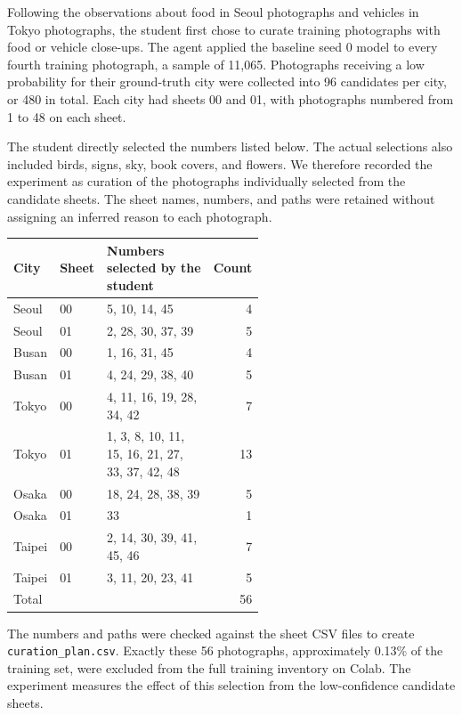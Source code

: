 \documentclass[11pt]{article}
\begin{document}
Following the observations about food in Seoul photographs and vehicles in
Tokyo photographs, the student first chose to curate training photographs
with food or vehicle close-ups. The agent applied the baseline seed 0 model
to every fourth training photograph, a sample of 11,065. Photographs receiving
a low probability for their ground-truth city were collected into 96
candidates per city, or 480 in total. Each city had sheets 00 and 01, with
photographs numbered from 1 to 48 on each sheet.

The student directly selected the numbers listed below. The actual selections
also included birds, signs, sky, book covers, and flowers. We therefore
recorded the experiment as curation of the photographs individually selected
from the candidate sheets. The sheet names, numbers, and paths were retained
without assigning an inferred reason to each photograph.

\begin{center}\small
\begin{tabular}{llp{0.56\linewidth}r}
\toprule
City & Sheet & Numbers selected by the student & Count \\
\midrule
Seoul & 00 & 5, 10, 14, 45 & 4 \\
Seoul & 01 & 2, 28, 30, 37, 39 & 5 \\
Busan & 00 & 1, 16, 31, 45 & 4 \\
Busan & 01 & 4, 24, 29, 38, 40 & 5 \\
Tokyo & 00 & 4, 11, 16, 19, 28, 34, 42 & 7 \\
Tokyo & 01 & 1, 3, 8, 10, 11, 15, 16, 21, 27, 33, 37, 42, 48 & 13 \\
Osaka & 00 & 18, 24, 28, 38, 39 & 5 \\
Osaka & 01 & 33 & 1 \\
Taipei & 00 & 2, 14, 30, 39, 41, 45, 46 & 7 \\
Taipei & 01 & 3, 11, 20, 23, 41 & 5 \\
\midrule
Total & & & 56 \\
\bottomrule
\end{tabular}
\end{center}

The numbers and paths were checked against the sheet CSV files to create
\texttt{curation\_plan.csv}. Exactly these 56 photographs, approximately
0.13\% of the training set, were excluded from the full training inventory
on Colab. The experiment measures the effect of this selection from the
low-confidence candidate sheets.
\end{document}
